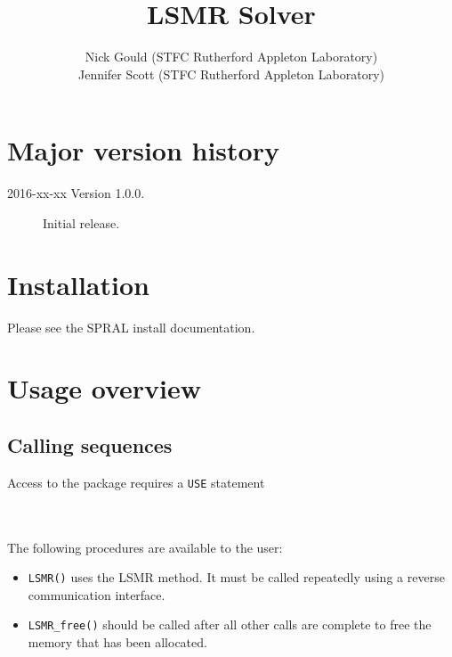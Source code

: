 \title{LSMR Solver}
\author{
   Nick Gould (STFC Rutherford Appleton Laboratory) \\
   Jennifer Scott (STFC Rutherford Appleton Laboratory)
}
\spralmaketitle
\thispagestyle{firststyle}

\newpage
\section*{Major version history}
\begin{description}
\item[2016-xx-xx Version 1.0.0.] Initial release.
\end{description}


\section{Installation}
Please see the SPRAL install documentation. 


\section{Usage overview}

\subsection{Calling sequences}

Access to the package requires a {\tt USE} statement \\ \\
\indent\hspace{8mm}{\tt use spral\_LSMR} \\

\medskip

\noindent
The following procedures are available to the user:
\begin{itemize}
\item {\tt LSMR()} uses the LSMR method. It must be called repeatedly
using a reverse communication interface.
\item {\tt LSMR\_free()} should be called after all other calls are complete
to free the memory that has been allocated. 
\end{itemize}



